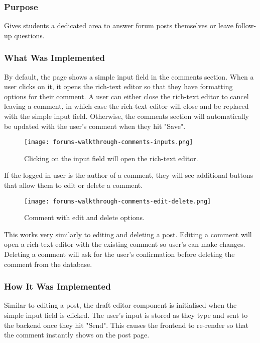 \subsubsection{Purpose}
Gives students a dedicated area to answer forum posts themselves or leave follow-up questions.

\subsubsection{What Was Implemented}
By default, the page shows a simple input field in the comments section.
When a user clicks on it, it opens the rich-text editor so that they have formatting options for their comment.
A user can either close the rich-text editor to cancel leaving a comment, in which case the rich-text editor will close and be replaced with the simple input field.
Otherwise, the comments section will automatically be updated with the user's comment when they hit "Save".

\begin{figure}[h!]
    \texttt{[image: forums-walkthrough-comments-inputs.png]}
    \centering
    \caption{Clicking on the input field will open the rich-text editor.}
\end{figure}

If the logged in user is the author of a comment, they will see additional buttons that allow them to edit or delete a comment.

\begin{figure}[h!]
    \texttt{[image: forums-walkthrough-comments-edit-delete.png]}
    \centering
    \caption{Comment with edit and delete options.}
\end{figure}

This works very similarly to editing and deleting a post.
Editing a comment will open a rich-text editor with the existing comment so user's can make changes.
Deleting a comment will ask for the user's confirmation before deleting the comment from the database.

\subsubsection{How It Was Implemented}
Similar to editing a post, the draft editor component is initialised when the simple input field is clicked.
The user's input is stored as they type and sent to the backend once they hit "Send".
This causes the frontend to re-render so that the comment instantly shows on the post page.


